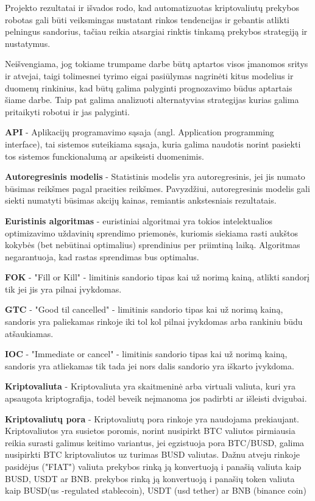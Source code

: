 \documentclass{VUMIFInfKursinis}
\begin{document}
Projekto rezultatai ir išvados rodo, kad automatizuotas kriptovaliutų prekybos robotas gali būti veiksmingas nustatant rinkos tendencijas ir gebantis atlikti pelningus sandorius,
tačiau reikia atsargiai rinktis tinkamą prekybos strategiją ir nustatymus. 

Neišvengiama, jog tokiame trumpame darbe būtų aptartos visos įmanomos sritys ir atvejai, taigi tolimesnei tyrimo eigai pasiūlymas nagrinėti kitus modelius
ir duomenų rinkinius, kad būtų galima palyginti prognozavimo būdus aptartais šiame darbe. Taip pat galima analizuoti alternatyvias strategijas kurias galima
pritaikyti robotui ir jas palyginti. 


\textbf{API} - Aplikacijų programavimo sąsaja (angl. Application programming interface), tai sistemos suteikiama sąsaja, kuria galima naudotis norint pasiekti tos sistemos
funckionalumą ar apsikeisti duomenimis.

\textbf{Autoregresinis modelis} - Statistinis modelis yra autoregresinis, jei jis numato būsimas reikšmes pagal praeities reikšmes. Pavyzdžiui, autoregresinis modelis gali
siekti numatyti būsimas akcijų kainas, remiantis ankstesniais rezultatais.

\textbf{Euristinis algoritmas} - euristiniai algoritmai yra tokios intelektualios optimizavimo uždavinių sprendimo priemonės, kuriomis siekiama rasti aukštos
kokybės (bet nebūtinai optimalius) sprendinius per priimtiną laiką. Algoritmas negarantuoja, kad rastas sprendimas bus optimalus. \cite{misevivcius2009euristiniku}

\textbf{FOK} - "Fill or Kill" - limitinis sandorio tipas kai už norimą kainą, atlikti sandorį tik jei jis yra pilnai įvykdomas.

\textbf{GTC} - "Good til cancelled" - limitinis sandorio tipas kai už norimą kainą, sandoris yra paliekamas rinkoje iki tol kol pilnai įvykdomas arba rankiniu būdu atšaukiamas.

\textbf{IOC} - "Immediate or cancel" - limitinis sandorio tipas kai už norimą kainą, sandoris yra atliekamas tik tada jei nors dalis sandorio yra iškarto įvykdoma.

\textbf{Kriptovaliuta} - Kriptovaliuta yra skaitmeninė arba virtuali valiuta, kuri yra apsaugota kriptografija, todėl beveik neįmanoma jos padirbti ar išleisti dvigubai.

\textbf{Kriptovaliutų pora} - Kriptovaliutų pora rinkoje yra naudojama prekiaujant. Kriptovaliutos yra susietos poromis, norint nusipirkt BTC valiutos pirmiausia reikia surasti 
galimus keitimo variantus, jei egzistuoja pora BTC/BUSD, galima nusipirkti BTC kriptovaliutos uz turimas BUSD valiutas. Dažnu atveju rinkoje pasidėjus ("FIAT") valiuta
prekybos rinką ją konvertuoją i panašią valiuta kaip BUSD, USDT ar BNB.
prekybos rinką ją konvertuoją i panašių token valiuta kaip BUSD(us -regulated stablecoin), USDT (usd tether) ar BNB (binance coin)
\end{document}
